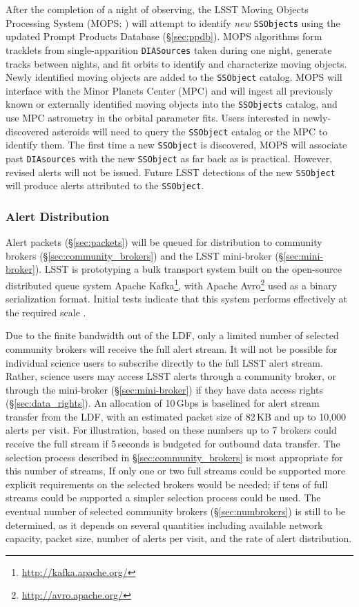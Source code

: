 After the completion of a night of observing,
the LSST Moving Objects Processing System (MOPS; ) will attempt to identify \textit{new} \texttt{SSObjects} using the updated Prompt Products Database (\S \ref{sec:ppdb}).
MOPS algorithms form tracklets from single-apparition \texttt{DIASources} taken during one night, generate tracks between nights, and fit orbits to identify and characterize moving objects.
Newly identified moving objects are added to the {\tt SSObject} catalog.
MOPS will interface with the Minor Planets Center (MPC) and will ingest all previously known or externally identified moving objects into the {\tt SSObjects} catalog, and use MPC astrometry in the orbital parameter fits.
Users interested in newly-discovered asteroids will need to query the \texttt{SSObject} catalog or the MPC to identify them.
The first time a new \texttt{SSObject} is discovered, MOPS will associate past \texttt{DIAsources} with the new \texttt{SSObject} as far back as is practical.
However, revised alerts will not be issued.
Future LSST detections of the new \texttt{SSObject} will produce alerts attributed to the \texttt{SSObject}.


\subsubsection{Alert Distribution} \label{sec:alert_distribution}

Alert packets (\S \ref{sec:packets}) will be queued for distribution to community brokers (\S \ref{sec:community_brokers}) and the LSST mini-broker (\S \ref{sec:mini-broker}). 
LSST is prototyping  a bulk transport system built on the open-source distributed queue system Apache Kafka\footnote{\url{http://kafka.apache.org/}}, with Apache Avro\footnote{\url{http://avro.apache.org/}} used as a binary serialization format.
Initial tests indicate that this system performs effectively at the required scale .


Due to the finite bandwidth out of the LDF, only a limited number of selected community brokers will receive the full alert stream.
It will not be possible for individual science users to subscribe directly to the full LSST alert stream. 
Rather, science users may access LSST alerts through a community broker, or through the mini-broker (\S \ref{sec:mini-broker}) if they have data access rights (\S \ref{sec:data_rights}).
An allocation of 10\,Gbps is baselined for alert stream transfer from the LDF, with an estimated packet size of 82\,KB and up to 10,000 alerts per visit.
For illustration, based on these numbers up to 7 brokers could receive the full stream if 5\,seconds is budgeted for outbound data transfer.
The selection process described in \S \ref{sec:community_brokers} is most appropriate for this number of streams, 
If only one or two full streams could be supported more explicit requirements on the selected brokers would be needed; if tens of full streams could be supported a simpler selection process could be used. 
The eventual number of selected community brokers (\S \ref{sec:numbrokers}) is still to be determined, as it depends on several quantities including available network capacity, packet size, number of alerts per visit, and the rate of alert distribution.


